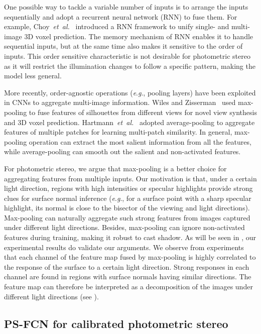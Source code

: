 \documentclass[10pt,journal,compsoc]{IEEEtran}
\newcommand{\etal}{\textit{et~al.}}
\newcommand{\eg}{\textit{e}.\textit{g}.}
\begin{document}
One possible way to tackle a variable number of inputs is to arrange the inputs sequentially and adopt a recurrent neural network (RNN) to fuse them. For example, Choy~\etal~\cite{choy20163d} introduced a RNN framework to unify single- and multi-image 3D voxel prediction. The memory mechanism of RNN enables it to handle sequential inputs, but at the same time also makes it sensitive to the order of inputs. This order sensitive characteristic is not desirable for photometric stereo as it will restrict the illumination changes to follow a specific pattern, making the model less general.

More recently, order-agnostic operations (\eg, pooling layers) have been exploited in CNNs to aggregate multi-image information. Wiles and Zisserman~\cite{wiles2017silnet} used max-pooling to fuse features of silhouettes from different views for novel view synthesis and 3D voxel prediction. Hartmann~\etal~\cite{hartmann2017learned} adopted average-pooling to aggregate features of multiple patches for learning multi-patch similarity. In general, max-pooling operation can extract the most salient information from all the features, while average-pooling can smooth out the salient and non-activated features. 

For photometric stereo, we argue that max-pooling is a better choice for aggregating features from multiple inputs. 
Our motivation is that, under a certain light direction, regions with high intensities or specular highlights provide strong clues for surface normal inference (\eg, for a surface point with a sharp specular highlight, its normal is close to the bisector of the viewing and light directions). Max-pooling can naturally aggregate such strong features from images captured under different light directions. Besides, max-pooling can ignore non-activated features during training, making it robust to cast shadow. As will be seen in , our experimental results do validate our arguments. We observe from experiments that each channel of the feature map fused by max-pooling is highly correlated to the response of the surface to a certain light direction. Strong responses in each channel are found in regions with surface normals having similar directions. The feature map can therefore be interpreted as a decomposition of the images under different light directions (see ).


\subsection{PS-FCN for calibrated photometric stereo}
\end{document}
